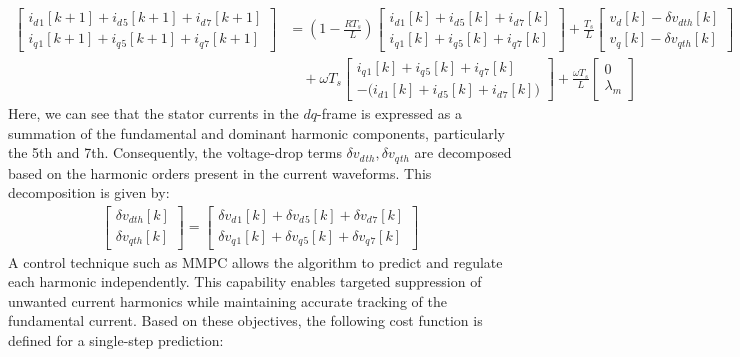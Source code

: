 \begin{equation}
\begin{aligned}
\begin{bmatrix}
i_d{}_{1}[k+1] + i_d{}_{5}[k+1] + i_d{}_{7}[k+1]\\
i_q{}_{1}[k+1] + i_q{}_{5}[k+1] + i_q{}_{7}[k+1]
\end{bmatrix}
&=
\left(1-\frac{R T_s}{L}\right)
\begin{bmatrix}
i_d{}_{1}[k] + i_d{}_{5}[k] + i_d{}_{7}[k]\\
i_q{}_{1}[k] + i_q{}_{5}[k] + i_q{}_{7}[k]
\end{bmatrix}
+
\frac{T_s}{L}
\begin{bmatrix}
v_d[k] - \delta v_{dth}[k]\\
v_q[k] - \delta v_{qth}[k]
\end{bmatrix}\\
&\quad
+ \omega T_s
\begin{bmatrix}
i_q{}_{1}[k] + i_q{}_{5}[k] + i_q{}_{7}[k]\\
-\big(i_d{}_{1}[k] + i_d{}_{5}[k] + i_d{}_{7}[k]\big)
\end{bmatrix}
+
\frac{\omega T_s}{L}
\begin{bmatrix}
0\\
\lambda_m
\end{bmatrix}
\end{aligned}
\label{eq:expanded_current}
\end{equation}
Here, we can see that the stator currents in the \(dq\)-frame is expressed as a summation of the fundamental and dominant harmonic components, particularly the 5th and 7th. Consequently, the voltage-drop terms $\delta v_{d}{}_{th}, \delta v_{q}{}_{th}$ are decomposed based on the harmonic orders present in the current waveforms. This decomposition is given by:
\begin{equation}
\begin{aligned}
\begin{bmatrix}
\delta v_{dth}[k]\\
\delta v_{qth}[k]
\end{bmatrix}
=
\begin{bmatrix}
\delta v_d{}_{1}[k] + \delta v_d{}_{5}[k] + \delta v_d{}_{7}[k]\\
\delta v_q{}_{1}[k] + \delta v_q{}_{5}[k] + \delta v_q{}_{7}[k]
\end{bmatrix}
\end{aligned}
\end{equation}
A control technique such as MMPC allows the algorithm to predict and regulate each harmonic independently. This capability enables targeted suppression of unwanted current harmonics while maintaining accurate tracking of the fundamental current. Based on these objectives, the following cost function is defined for a single-step prediction:
